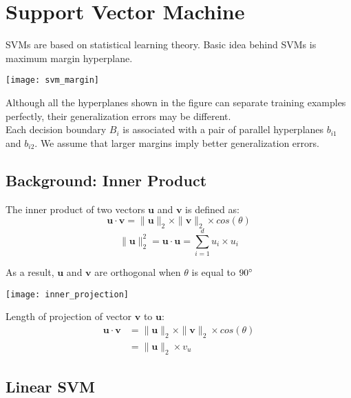\chapter{Support Vector Machine}

\begin{multicols}{2}
\noindent SVMs are based on statistical learning theory. Basic idea behind SVMs is maximum margin
hyperplane.

\begin{center}
\texttt{[image: svm\_margin]}
\end{center}

\noindent Although all the hyperplanes shown in the figure can separate training examples perfectly, their generalization errors may be different. \\

\noindent Each decision boundary $B_i$ is associated with a pair of parallel hyperplanes $b_{i1}$ and $b_{i2}$. We assume that larger margins imply better generalization errors.

\section{Background: Inner Product}

\noindent The inner product of two vectors $\mathbf{u}$ and $\mathbf{v}$ is defined as:
$$\mathbf{u} \cdot \mathbf{v} = \|\mathbf{u} \|_2 \times \|\mathbf{v} \|_2 \times cos(\theta)$$
$$\|\mathbf{u} \|_2^2 = \mathbf{u} \cdot \mathbf{u} = \sum_{i=1}^d u_i \times u_i$$

\noindent As a result, $\mathbf{u}$ and $\mathbf{v}$ are orthogonal when $\theta$ is equal to $90\degree$

\begin{center}
\texttt{[image: inner\_projection]}
\end{center}

\noindent Length of projection of vector $\mathbf{v}$ to $\mathbf{u}$:
\begin{equation*}
\begin{split}
    \mathbf{u} \cdot \mathbf{v} &= \|\mathbf{u} \|_2 \times \|\mathbf{v} \|_2 \times cos(\theta) \\
    &= \|\mathbf{u} \|_2 \times v_u
\end{split}
\end{equation*}

\section{Linear SVM}


\end{multicols}
